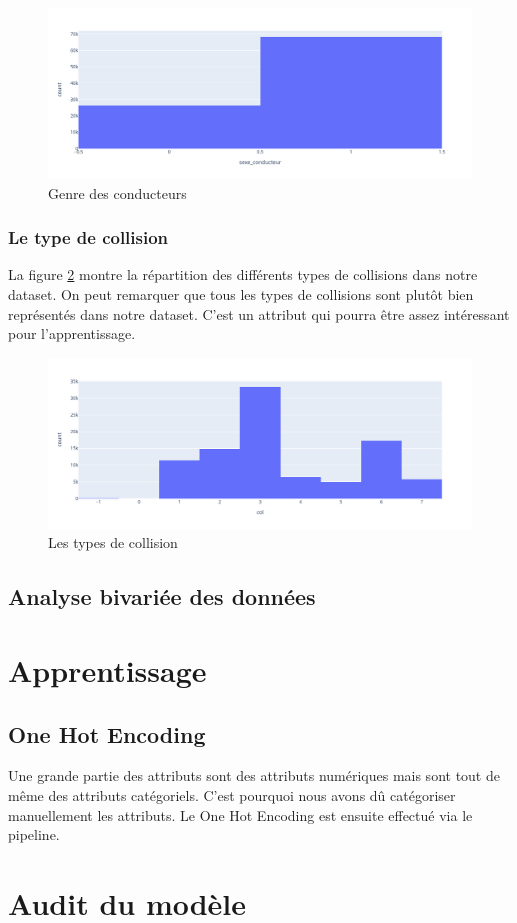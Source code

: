 \documentclass[]{article}
\begin{document}
    \begin{figure}[ht]
        \centering
        \includegraphics[width=12cm]{./img/sexe.png}
        \caption{Genre des conducteurs}
        \label{fig:fig_genre}
    \end{figure}

    \subsubsection{Le type de collision}
    La figure \ref{fig:fig_col} montre la répartition des différents types de collisions dans notre dataset. On peut 
    remarquer que tous les types de collisions sont plutôt bien représentés dans notre dataset. C'est un attribut qui 
    pourra être assez intéressant pour l'apprentissage.

    \begin{figure}[ht]
        \centering
        \includegraphics[width=12cm]{./img/col.png}
        \caption{Les types de collision}
        \label{fig:fig_col}
    \end{figure}

    \subsection{Analyse bivariée des données}

    \section{Apprentissage}
    \subsection{One Hot Encoding}
    Une grande partie des attributs sont des attributs numériques mais sont tout de même des attributs catégoriels.
    C'est pourquoi nous avons dû catégoriser manuellement les attributs.
    Le One Hot Encoding est ensuite effectué via le pipeline.

    \section{Audit du modèle}
\end{document}
